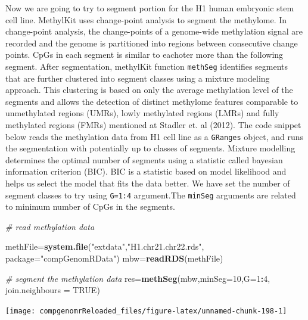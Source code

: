 \documentclass[12pt,]{krantz}
\newenvironment{Shaded}{\begin{snugshade}}{\end{snugshade}}
\newcommand{\CommentTok}[1]{\textcolor[rgb]{0.56,0.35,0.01}{\textit{#1}}}
\newcommand{\DataTypeTok}[1]{\textcolor[rgb]{0.13,0.29,0.53}{#1}}
\newcommand{\DecValTok}[1]{\textcolor[rgb]{0.00,0.00,0.81}{#1}}
\newcommand{\KeywordTok}[1]{\textcolor[rgb]{0.13,0.29,0.53}{\textbf{#1}}}
\newcommand{\NormalTok}[1]{#1}
\newcommand{\OperatorTok}[1]{\textcolor[rgb]{0.81,0.36,0.00}{\textbf{#1}}}
\newcommand{\OtherTok}[1]{\textcolor[rgb]{0.56,0.35,0.01}{#1}}
\newcommand{\StringTok}[1]{\textcolor[rgb]{0.31,0.60,0.02}{#1}}
\begin{document}
Now we are going to try to segment portion for the H1 human embryonic stem cell line. MethylKit uses change-point analysis to segment the methylome. In change-point analysis, the change-points of a genome-wide methylation signal are recorded and the genome is partitioned into regions between consecutive change points. CpGs in each segment is similar to eachoter more than the following segment.
After segmentation, methylKit function \texttt{methSeg} identifies segments that are further clustered into segment classes using a mixture modeling approach. This clustering is based on only the average methylation level of the segments and allows the detection of distinct methylome features comparable to unmethylated regions (UMRs), lowly methylated regions (LMRs) and fully methylated regions (FMRs) mentioned at Stadler et. al (2012). The code snippet below reads the methylation data from H1 cell line as a \texttt{GRanges} object, and runs the segmentation with potentially up to classes of segments. Mixture modelling determines the optimal number of segments using a statistic called bayesian information criterion (BIC). BIC is a statistic based on model likelihood and helps us select the model that fits the data better. We have set the number of segment classes to try using \texttt{G=1:4} argument.The \texttt{minSeg} arguments are related to minimum number of CpGs in the segments.

\begin{Shaded}
\begin{Highlighting}[]
\CommentTok{# read methylation data}

\NormalTok{methFile=}\KeywordTok{system.file}\NormalTok{(}\StringTok{"extdata"}\NormalTok{,}\StringTok{"H1.chr21.chr22.rds"}\NormalTok{,}
                     \DataTypeTok{package=}\StringTok{"compGenomRData"}\NormalTok{)}
\NormalTok{mbw=}\KeywordTok{readRDS}\NormalTok{(methFile)}

\CommentTok{# segment the methylation data}
\NormalTok{res=}\KeywordTok{methSeg}\NormalTok{(mbw,}\DataTypeTok{minSeg=}\DecValTok{10}\NormalTok{,}\DataTypeTok{G=}\DecValTok{1}\OperatorTok{:}\DecValTok{4}\NormalTok{,}
            \DataTypeTok{join.neighbours =} \OtherTok{TRUE}\NormalTok{)}
\end{Highlighting}
\end{Shaded}

\begin{center}\texttt{[image: compgenomrReloaded\_files/figure-latex/unnamed-chunk-198-1]} \end{center}
\end{document}
